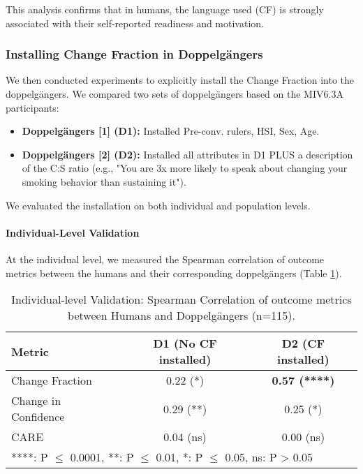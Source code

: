 This analysis confirms that in humans, the language used (CF) is strongly associated with their self-reported readiness and motivation.

\subsubsection{Installing Change Fraction in Doppelgängers}

We then conducted experiments to explicitly install the Change Fraction into the doppelgängers. We compared two sets of doppelgängers based on the MIV6.3A participants:
\begin{itemize}
    \item \textbf{Doppelgängers [1] (D1):} Installed Pre-conv. rulers, HSI, Sex, Age.
    \item \textbf{Doppelgängers [2] (D2):} Installed all attributes in D1 PLUS a description of the C:S ratio (e.g., "You are 3x more likely to speak about changing your smoking behavior than sustaining it").
\end{itemize}

We evaluated the installation on both individual and population levels.

\paragraph{Individual-Level Validation}

At the individual level, we measured the Spearman correlation of outcome metrics between the humans and their corresponding doppelgängers (Table \ref{tab:cf_installation_individual}).

\begin{table}[h]
\centering
\caption{Individual-level Validation: Spearman Correlation of outcome metrics between Humans and Doppelgängers (n=115).}
\label{tab:cf_installation_individual}
\begin{tabular}{|l|c|c|}
\hline
\textbf{Metric} & \textbf{D1 (No CF installed)} & \textbf{D2 (CF installed)} \\ \hline
Change Fraction & 0.22 (*) & \textbf{0.57 (****)} \\
Change in Confidence & 0.29 (**) & 0.25 (*) \\
CARE & 0.04 (ns) & 0.00 (ns) \\ \hline
\multicolumn{3}{l}{\footnotesize{****: P $\leq$ 0.0001, **: P $\leq$ 0.01, *: P $\leq$ 0.05, ns: P > 0.05}}
\end{tabular}
\end{table}

